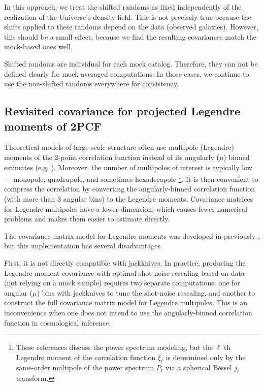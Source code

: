 In this approach, we treat the shifted randoms as fixed independently of the realization of the Universe's density field.
This is not precisely true because the shifts applied to these randoms depend on the data (observed galaxies).
However, this should be a small effect, because we find the resulting covariances match the mock-based ones well.

Shifted randoms are individual for each mock catalog.
Therefore, they can not be defined clearly for mock-averaged computations.
In those cases, we continue to use the non-shifted randoms everywhere for consistency.

\subsection{Revisited covariance for projected Legendre moments of 2PCF}
\label{sec:cov-estimation-new}

Theoretical models of large-scale structure often use multipole (Legendre) moments of the 2-point correlation function instead of its angularly ($\mu$) binned estimates (e.g. \cite{using-CF-multipoles-SDSS-LRG,KP4s2-Chen}).
Moreover, the number of multipoles of interest is typically low --- monopole, quadrupole, and sometimes hexadecapole \citep{KP5s1-Maus,KP5s2-Maus,KP5s3-Noriega,KP5s4-Lai,KP5s5-Ramirez}\footnote{These references discuss the power spectrum modeling, but the $\ell$'th Legendre moment of the correlation function $\xi_\ell$ is determined only by the same-order multipole of the power spectrum $P_\ell$ via a spherical Bessel $j_\ell$ transform.}.
It is then convenient to compress the correlation by converting the angularly-binned correlation function (with more than 3 angular bins) to the Legendre moments.
Covariance matrices for Legendre multipoles have a lower dimension, which causes fewer numerical problems and makes them easier to estimate directly.

The covariance matrix model for Legendre moments was developed in \rascalc{} previously \citep{rascalC-legendre-3}, but this implementation has several disadvantages.

First, it is not directly compatible with jackknives.
In practice, producing the Legendre moment covariance with optimal shot-noise rescaling based on data (not relying on a mock sample) requires two separate computations: one for angular ($\mu$) bins with jackknives to tune the shot-noise rescaling, and another to construct the full covariance matrix model for Legendre multipoles.
This is an inconvenience when one does not intend to use the angularly-binned correlation function in cosmological inference.

